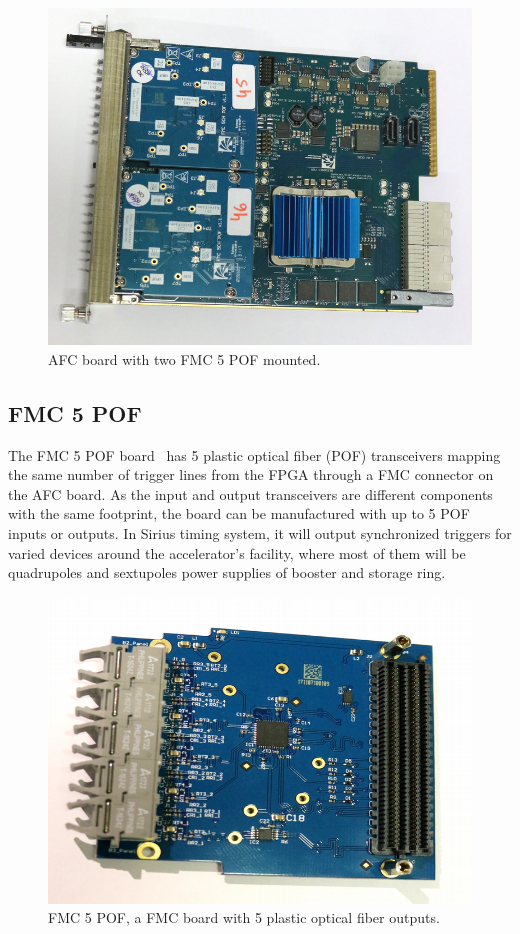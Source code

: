 \documentclass[a4paper,
               biblatex,      %
               ]{jacow}
\begin{document}
\begin{figure}[!htb]
   \centering
   \includegraphics*[width=0.8\columnwidth]{AFC_POFs_resized}
   \caption{AFC board with two FMC 5 POF mounted.}
   \label{fig:afc_pofs}
\end{figure}

\subsection{FMC 5 POF}

The FMC 5 POF board~\cite{fmc-pof-git} has 5 plastic optical fiber (POF) transceivers mapping the same number of trigger lines from the FPGA through a FMC connector on the AFC board. As the input and output transceivers are different components with the same footprint, the board can be manufactured with up to 5 POF inputs or outputs. In Sirius timing system, it will output synchronized triggers for varied devices around the accelerator's facility, where most of them will be quadrupoles and sextupoles power supplies of booster and storage ring.

\begin{figure}[!htb]
   \centering
   \includegraphics*[width=0.5\columnwidth]{FMC_POF_resized}
   \caption{FMC 5 POF, a FMC board with 5 plastic optical fiber outputs.}
   \label{fig:fmc_pof}
\end{figure}
\end{document}

